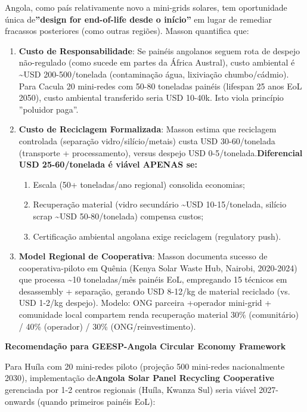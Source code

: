 \documentclass[12pt, a4paper]{article}
\begin{document}
Angola, como país relativamente novo a mini-grids solares, tem oportunidade única de\textbf{''design for end-of-life desde o início''} em lugar de remediar fracassos posteriores (como outras regiões). Masson quantifica que:

\begin{enumerate}
\item \textbf{Custo de Responsabilidade}: Se painéis angolanos seguem rota de despejo não-regulado (como sucede em partes da África Austral), custo ambiental é \textasciitilde{}USD 200-500/tonelada (contaminação água, lixiviação chumbo/cádmio). Para Cacula 20 mini-redes com 50-80 toneladas painéis (lifespan 25 anos EoL 2050), custo ambiental transferido seria USD 10-40k. Isto viola princípio ''poluidor paga''.

\item \textbf{Custo de Reciclagem Formalizada}: Masson estima que reciclagem controlada (separação vidro/silício/metais) custa USD 30-60/tonelada (transporte + processamento), versus despejo USD 0-5/tonelada.\textbf{Diferencial USD 25-60/tonelada é viável APENAS se:}
  \begin{enumerate}
  \item Escala (50+ toneladas/ano regional) consolida economias;
  \item Recuperação material (vidro secundário \textasciitilde{}USD 10-15/tonelada, silício scrap \textasciitilde{}USD 50-80/tonelada) compensa custos;
  \item Certificação ambiental angolana exige reciclagem (regulatory push).
  \end{enumerate}

\item \textbf{Model Regional de Cooperativa}: Masson documenta sucesso de cooperativa-piloto em Quênia (Kenya Solar Waste Hub, Nairobi, 2020-2024) que processa \textasciitilde{}10 toneladas/mês painéis EoL, empregando 15 técnicos em desassembly + separação, gerando USD 8-12/kg de material reciclado (vs. USD 1-2/kg despejo). Modelo: ONG parceira +operador mini-grid + comunidade local compartem renda recuperação material 30\% (comunitário) / 40\% (operador) / 30\% (ONG/reinvestimento).

\end{enumerate}

\textbf{Recomendação para GEESP-Angola Circular Economy Framework}

Para Huíla com 20 mini-redes piloto (projeção 500 mini-redes nacionalmente 2030), implementação de\textbf{Angola Solar Panel Recycling Cooperative} gerenciada por 1-2 centros regionais (Huíla, Kwanza Sul) seria viável 2027-onwards (quando primeiros painéis EoL):
\end{document}

